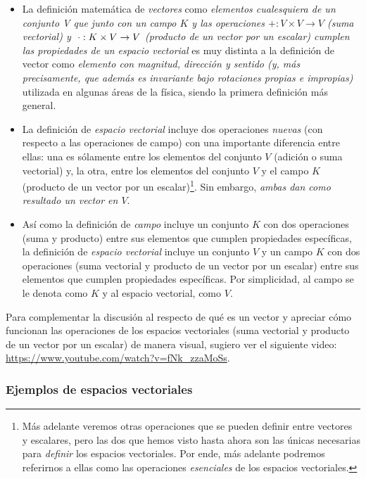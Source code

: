 \documentclass[12pt,dvipsnames]{article}
\begin{document}
\begin{itemize}
    \item La definición matemática de \textit{vectores} como \textit{elementos cualesquiera de un conjunto V que \textemdash junto con un campo $K$ y las operaciones $+:V\times V\to V$ (suma vectorial) y $\hspace{1mm} \cdot:K\times V\to V$ (producto de un vector por un escalar) \textemdash\hspace{0.5mm} cumplen las propiedades de un espacio vectorial} es muy distinta a la definición de vector como \textit{elemento con magnitud, dirección y sentido (y, más precisamente, que además es invariante bajo rotaciones propias e impropias)} utilizada en algunas áreas de la física, siendo la primera definición más general.
    \item La definición de \textit{espacio vectorial} incluye dos operaciones \textit{nuevas} (con respecto a las operaciones de campo) con una importante diferencia entre ellas: una es sólamente entre los elementos del conjunto $V$ (adición o suma vectorial) y, la otra, entre los elementos del conjunto $V$ y el campo $K$ (producto de un vector por un escalar)\footnote{Más adelante veremos otras operaciones que se pueden definir entre vectores y escalares, pero las dos que hemos visto hasta ahora son las únicas necesarias para \textit{definir} los espacios vectoriales. Por ende, más adelante podremos referirnos a ellas como las operaciones \emph{esenciales} de los espacios vectoriales.}. Sin embargo, \emph{ambas dan como resultado un vector en $V$}.
    \item Así como la definición de \textit{campo} incluye un conjunto $K$ con dos operaciones (suma y producto) entre sus elementos que cumplen propiedades específicas, la definición de \textit{espacio vectorial} incluye un conjunto $V$ y un campo $K$ con dos operaciones (suma vectorial y producto de un vector por un escalar) entre sus elementos que cumplen propiedades específicas. Por simplicidad, al campo se le denota como $K$ y al espacio vectorial, como $V$.
    
\end{itemize}{}

Para complementar la discusión al respecto de qué es un vector y apreciar cómo funcionan las operaciones de los espacios vectoriales (suma vectorial y producto de un vector por un escalar) de manera visual, sugiero ver el siguiente video: \url{https://www.youtube.com/watch?v=fNk_zzaMoSs}.

\subsubsection{Ejemplos de espacios vectoriales} \label{Ejem:Espacios_vectoriales}
\end{document}
